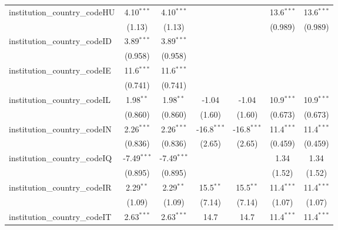 \begin{tabular}{lcccccc}
   institution\_country\_codeHU          & 4.10$^{***}$   & 4.10$^{***}$   &               &               & 13.6$^{***}$  & 13.6$^{***}$\\   
                                         & (1.13)         & (1.13)         &               &               & (0.989)       & (0.989)\\   
   institution\_country\_codeID          & 3.89$^{***}$   & 3.89$^{***}$   &               &               &               &   \\   
                                         & (0.958)        & (0.958)        &               &               &               &   \\   
   institution\_country\_codeIE          & 11.6$^{***}$   & 11.6$^{***}$   &               &               &               &   \\   
                                         & (0.741)        & (0.741)        &               &               &               &   \\   
   institution\_country\_codeIL          & 1.98$^{**}$    & 1.98$^{**}$    & -1.04         & -1.04         & 10.9$^{***}$  & 10.9$^{***}$\\   
                                         & (0.860)        & (0.860)        & (1.60)        & (1.60)        & (0.673)       & (0.673)\\   
   institution\_country\_codeIN          & 2.26$^{***}$   & 2.26$^{***}$   & -16.8$^{***}$ & -16.8$^{***}$ & 11.4$^{***}$  & 11.4$^{***}$\\   
                                         & (0.836)        & (0.836)        & (2.65)        & (2.65)        & (0.459)       & (0.459)\\   
   institution\_country\_codeIQ          & -7.49$^{***}$  & -7.49$^{***}$  &               &               & 1.34          & 1.34\\   
                                         & (0.895)        & (0.895)        &               &               & (1.52)        & (1.52)\\   
   institution\_country\_codeIR          & 2.29$^{**}$    & 2.29$^{**}$    & 15.5$^{**}$   & 15.5$^{**}$   & 11.4$^{***}$  & 11.4$^{***}$\\   
                                         & (1.09)         & (1.09)         & (7.14)        & (7.14)        & (1.07)        & (1.07)\\   
   institution\_country\_codeIT          & 2.63$^{***}$   & 2.63$^{***}$   & 14.7          & 14.7          & 11.4$^{***}$  & 11.4$^{***}$\\   

\end{tabular}
